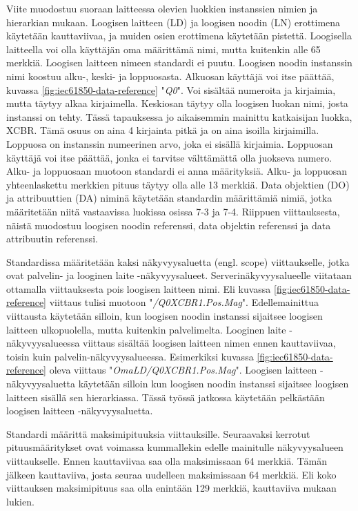 Viite muodostuu suoraan laitteessa olevien luokkien instanssien nimien ja hierarkian mukaan. Loogisen laitteen (LD) ja loogisen noodin (LN) erottimena käytetään kauttaviivaa, ja muiden osien erottimena käytetään pistettä. Loogisella laitteella voi olla käyttäjän oma määrittämä nimi, mutta kuitenkin alle 65 merkkiä. Loogisen laitteen nimeen standardi ei puutu. Loogisen noodin instanssin nimi koostuu alku-, keski- ja loppuosasta. Alkuosan käyttäjä voi itse päättää, kuvassa \ref{fig:iec61850-data-reference} "\emph{Q0}". Voi sisältää numeroita ja kirjaimia, mutta täytyy alkaa kirjaimella. Keskiosan täytyy olla loogisen luokan nimi, josta instanssi on tehty. Tässä tapauksessa jo aikaisemmin mainittu katkaisijan luokka, XCBR. Tämä osuus on aina 4 kirjainta pitkä ja on aina isoilla kirjaimilla. Loppuosa on instanssin numeerinen arvo, joka ei sisällä kirjaimia. Loppuosan käyttäjä voi itse päättää, jonka ei tarvitse välttämättä olla juokseva numero. Alku- ja loppuosaan muotoon standardi ei anna määrityksiä. Alku- ja loppuosan yhteenlaskettu merkkien pituus täytyy olla alle 13 merkkiä. Data objektien (DO) ja attribuuttien (DA) niminä käytetään standardin määrittämiä nimiä, jotka määritetään niitä vastaavissa luokissa osissa 7-3 ja 7-4. Riippuen viittauksesta, näistä muodostuu loogisen noodin referenssi, data objektin referenssi ja data attribuutin referenssi. \cite[s.~181--182]{IEC61850-7-2} \cite[s.~93--95]{IEC61850-7-1}

Standardissa määritetään kaksi näkyvyysaluetta (engl. scope) viittaukselle, jotka ovat palvelin- ja looginen laite -näkyvyysalueet. Serverinäkyvyysalueelle viitataan ottamalla viittauksesta pois loogisen laitteen nimi. Eli kuvassa \ref{fig:iec61850-data-reference} viittaus tulisi muotoon "\emph{/Q0XCBR1.Pos.Mag}". Edellemainittua viittausta käytetään silloin, kun loogisen noodin instanssi sijaitsee loogisen laitteen ulkopuolella, mutta kuitenkin palvelimelta. Looginen laite -näkyvyysalueessa viittaus sisältää loogisen laitteen nimen ennen kauttaviivaa, toisin kuin palvelin-näkyvyysalueessa. Esimerkiksi kuvassa \ref{fig:iec61850-data-reference} oleva viittaus "\emph{OmaLD/Q0XCBR1.Pos.Mag}". Loogisen laitteen -näkyvyysaluetta käytetään silloin kun loogisen noodin instanssi sijaitsee loogisen laitteen sisällä sen hierarkiassa. Tässä työssä jatkossa käytetään pelkästään loogisen laitteen -näkyvyysaluetta. \cite[s.~183]{IEC61850-7-2}

Standardi määrittä maksimipituuksia viittauksille. Seuraavaksi kerrotut pituusmääritykset ovat voimassa kummallekin edelle mainitulle näkyvyysalueen viittaukselle. Ennen kauttaviivaa saa olla maksimissaan 64 merkkiä. Tämän jälkeen kauttaviiva, josta seuraa uudelleen maksimissaan 64 merkkiä. Eli koko viittauksen maksimipituus saa olla enintään 129 merkkiä, kauttaviiva mukaan lukien. \cite[s.~183]{IEC61850-7-2}


